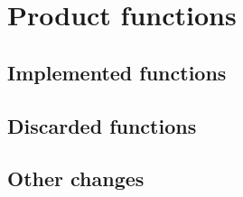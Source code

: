 \section{Product functions}

\subsection{Implemented functions}

\subsection{Discarded functions}

\subsection{Other changes}

